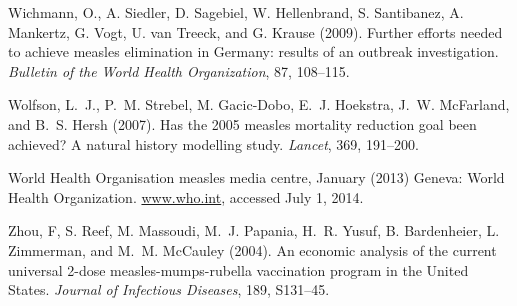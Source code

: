 \documentclass{article}
\begin{document}
\begin{thebibliography}{}
Wichmann, O., A. Siedler, D. Sagebiel, W. Hellenbrand, S. Santibanez, A. Mankertz, G. Vogt, U. van Treeck, and G. Krause (2009).
\newblock Further efforts needed to achieve measles elimination in Germany: results of an outbreak investigation.
\newblock \emph{Bulletin of the World Health Organization}, 87, 108--115.

Wolfson, L.~J., P.~M. Strebel, M. Gacic-Dobo, E.~J. Hoekstra, J.~W. McFarland, and B.~S. Hersh (2007).
\newblock Has the 2005 measles mortality reduction goal been achieved? A natural history modelling study.
\newblock \emph{Lancet}, 369, 191--200.

World Health Organisation measles media centre, January (2013)
\newblock Geneva: World Health Organization.
\href{http://www.who.int/mediacentre/news/notes/2013/measles_20130117/en/}{www.who.int}, accessed July 1, 2014.

Zhou, F, S. Reef, M. Massoudi, M.~J. Papania, H.~R. Yusuf, B. Bardenheier, L. Zimmerman, and M.~M. McCauley (2004).
\newblock An economic analysis of the current universal 2-dose measles-mumps-rubella vaccination program in the United States.
\newblock \emph{Journal of Infectious Diseases}, 189, S131--45.

\end{thebibliography}
\end{document}
